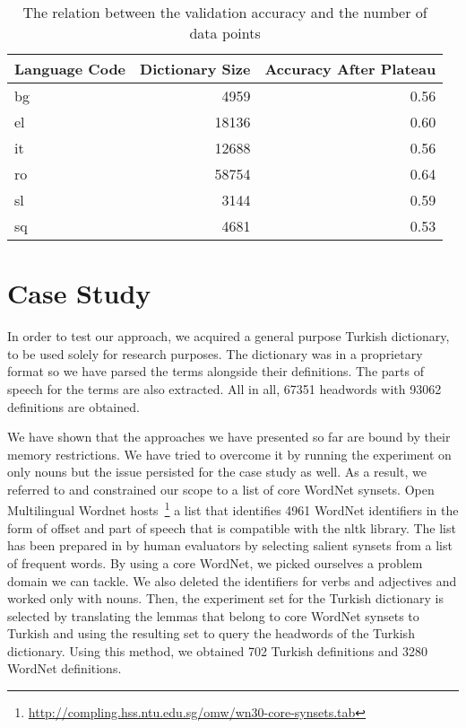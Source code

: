 \begin{table}[htbp]
    \centering
    \begin{tabulary}{1\linewidth}{L R R}
        \toprule
        Language Code & Dictionary Size & Accuracy After Plateau  \\
        \midrule
        bg & 4959 & 0.56  \\
        el & 18136 & 0.60  \\
        it & 12688 & 0.56  \\
        ro & 58754 & 0.64  \\
        sl & 3144 & 0.59  \\
        sq & 4681 & 0.53 \\
        \bottomrule
    \end{tabulary}
    \caption{The relation between the validation accuracy and the number of data points}%
    \label{tab:lstm_size_acc}
\end{table}

\section{Case Study}%
\label{sec:case_study}

In order to test our approach, we acquired a general purpose Turkish dictionary, to be used solely for research purposes.
The dictionary was in a proprietary format so we have parsed the terms alongside their definitions.
The parts of speech for the terms are also extracted.
All in all, 67351 headwords with 93062 definitions are obtained.

We have shown that the approaches we have presented so far are bound by their memory restrictions.
We have tried to overcome it by running the experiment on only nouns but the issue persisted for the case study as well.
As a result, we referred to \textcite{khodak_automated_2017} and constrained our scope to a list of core WordNet synsets.
Open Multilingual Wordnet hosts~\footnote{\url{http://compling.hss.ntu.edu.sg/omw/wn30-core-synsets.tab}} a list that identifies 4961 WordNet identifiers in the form of offset and part of speech that is compatible with the nltk library.
The list has been prepared in \textcite{boyd-graber_adding_2006} by human evaluators by selecting salient synsets from a list of frequent words.
By using a core WordNet, we picked ourselves a problem domain we can tackle.
We also deleted the identifiers for verbs and adjectives and worked only with nouns.
Then, the experiment set for the Turkish dictionary is selected by translating the lemmas that belong to core WordNet synsets to Turkish and using the resulting set to query the headwords of the Turkish dictionary.
Using this method, we obtained 702 Turkish definitions and 3280 WordNet definitions.

